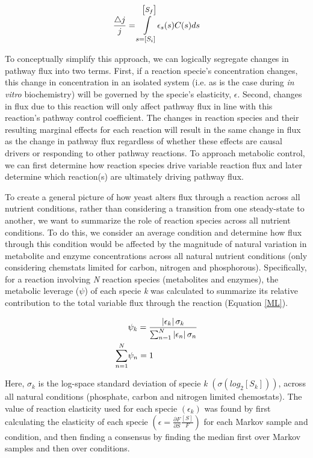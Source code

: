 \documentclass[12pt]{nature}\usepackage{graphicx, color}
\begin{document}
\begin{equation}
\frac{\bigtriangleup j}{j} = \mathlarger{\int\limits_{s = \left[S_{i}\right]}^{\left[S_{f}\right]}}\epsilon_{s}(s)C(s)ds
\label{KBequation}
\end{equation}

To conceptually simplify this approach, we can logically segregate changes in pathway flux into two terms. First, if a reaction specie's concentration changes, this change in concentration in an isolated system (i.e. as is the case during \textit{in vitro} biochemistry) will be governed by the specie's elasticity, $\epsilon$. Second, changes in flux due to this reaction will only affect pathway flux in line with this reaction's pathway control coefficient.  The changes in reaction species and their resulting marginal effects for each reaction will result in the same change in flux as the change in pathway flux regardless of whether these effects are causal drivers or responding to other pathway reactions. To approach metabolic control, we can first determine how reaction species drive variable reaction flux and later determine which reaction(s) are ultimately driving pathway flux.

To create a general picture of how yeast alters flux through a reaction across all nutrient conditions, rather than considering a transition from one steady-state to another, we want to summarize the role of reaction species across all nutrient conditions.  To do this, we consider an average condition and determine how flux through this condition would be affected by the magnitude of natural variation in metabolite and enzyme concentrations across all natural nutrient conditions (only considering chemstats limited for carbon, nitrogen and phosphorous).  Specifically, for a reaction involving \textit{N} reaction species (metabolites and enzymes), the metabolic leverage ($\psi$) of each specie \textit{k} was calculated to summarize its relative contribution to the total variable flux through the reaction (Equation \ref{ML}).  

\begin{align}
&\psi_{k} = \frac{\left|\epsilon_{k}\right|\sigma_{k}}{\sum_{n = 1}^{N}\left|\epsilon_{n}\right|\sigma_{n}}\label{ML}\\
\sum_{n = 1}^{N} &\psi_{n} = 1\notag
\end{align}

Here, $\sigma_{k}$ is the log-space standard deviation of specie \textit{k} $\left(\sigma\left(log_{2}\left[S_{k}\right]\right)\right)$, across all natural conditions (phosphate, carbon and nitrogen limited chemostats).  The value of reaction elasticity used for each specie $\left(\epsilon_{k}\right)$ was found by first calculating the elasticity of each specie $\left(\epsilon = \frac{\partial F}{\partial S}\frac{[S]}{F}\right)$ for each Markov sample and condition, and then finding a consensus by finding the median first over Markov samples and then over conditions. 
\end{document}
